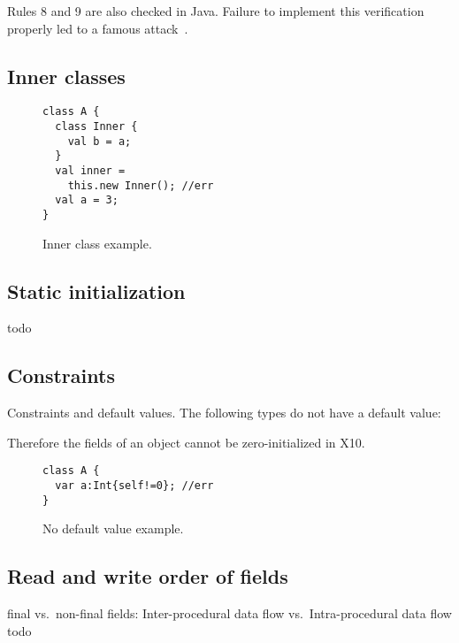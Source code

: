 Rules 8 and 9 are also checked in Java.
Failure to implement this verification properly led to a famous attack~\cite{Dean:1996}.


\subsection{Inner classes}
\begin{figure}
\begin{lstlisting}
class A {
  class Inner {
    val b = a;
  }
  val inner =
    this.new Inner(); //err
  val a = 3;
}
\end{lstlisting}
\caption{Inner class example.
    }
\label{Figure:InnerClass}
\end{figure}


\subsection{Static initialization}
todo


\subsection{Constraints}
Constraints and default values.
The following types do not have a default value:

Therefore the fields of an object cannot be zero-initialized in X10.

\begin{figure}
\begin{lstlisting}
class A {
  var a:Int{self!=0}; //err
}
\end{lstlisting}
\caption{No default value example.
    }
\label{Figure:Constraints}
\end{figure}

\subsection{Read and write order of fields}
final vs.\ non-final fields:
Inter-procedural data flow
vs.\
Intra-procedural data flow
todo

